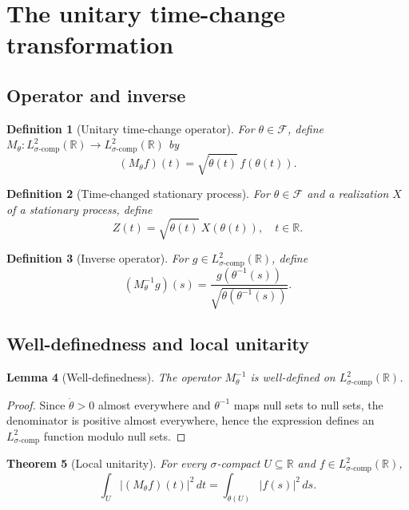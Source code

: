 \documentclass{article}
\newtheorem{theorem}{Theorem}[section]
\newtheorem{lemma}[theorem]{Lemma}
\newtheorem{definition}[theorem]{Definition}
\begin{document}
\section{The unitary time-change transformation}

\subsection{Operator and inverse}

\begin{definition}[Unitary time-change operator]\label{def:unitary_op}
For $\theta\in\mathcal{F}$, define $M_\theta: L^2_{\sigma\text{-comp}}(\mathbb{R})\to L^2_{\sigma\text{-comp}}(\mathbb{R})$ by
\[
(M_\theta f)(t) = \sqrt{\dot{\theta}(t)}\, f(\theta(t)).
\]
\end{definition}

\begin{definition}[Time-changed stationary process]\label{def:time_changed_proc}
For $\theta\in\mathcal{F}$ and a realization $X$ of a stationary process, define
\[
Z(t) = \sqrt{\dot{\theta}(t)}\, X(\theta(t)), \quad t\in\mathbb{R}.
\]
\end{definition}

\begin{definition}[Inverse operator]\label{def:inverse_unitary_op}
For $g\in L^2_{\sigma\text{-comp}}(\mathbb{R})$, define
\[
(M_\theta^{-1} g)(s) = \frac{g(\theta^{-1}(s))}{\sqrt{\dot{\theta}(\theta^{-1}(s))}}.
\]
\end{definition}

\subsection{Well-definedness and local unitarity}

\begin{lemma}[Well-definedness]\label{lem:inverse_well_defined}
The operator $M_\theta^{-1}$ is well-defined on $L^2_{\sigma\text{-comp}}(\mathbb{R})$.
\end{lemma}

\begin{proof}
Since $\dot{\theta}>0$ almost everywhere and $\theta^{-1}$ maps null sets to null sets, the denominator is positive almost everywhere, hence the expression defines an $L^2_{\sigma\text{-comp}}$ function modulo null sets.
\end{proof}

\begin{theorem}[Local unitarity]\label{thm:local_unitary}
For every $\sigma$-compact $U\subseteq\mathbb{R}$ and $f\in L^2_{\sigma\text{-comp}}(\mathbb{R})$,
\[
\int_U |(M_\theta f)(t)|^2\, dt = \int_{\theta(U)} |f(s)|^2\, ds.
\]
\end{theorem}
\end{document}
